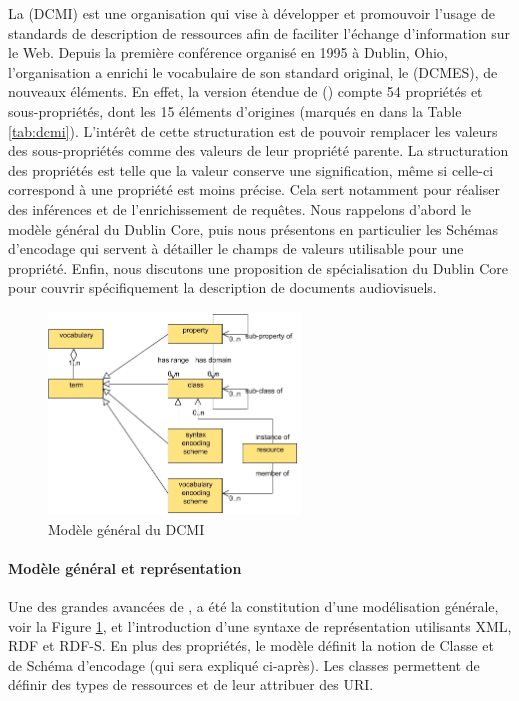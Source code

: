 La  (DCMI) est une organisation qui vise à développer et promouvoir l'usage de standards de description de ressources afin de faciliter l'échange d'information sur le Web.
Depuis la première conférence organisé en 1995 à Dublin, Ohio, l'organisation a enrichi le vocabulaire de son standard original, le  (DCMES), de nouveaux éléments. 
En effet, la version étendue de  (\cite{DCMIUsageBoard2010}) compte 54 propriétés et sous-propriétés, dont les 15 éléments d'origines (marqués en  dans la Table \ref{tab:dcmi}).
L'intérêt de cette structuration est de pouvoir remplacer les valeurs des sous-propriétés comme des valeurs de leur propriété parente. 
La structuration des propriétés est telle que la valeur conserve une signification, même si celle-ci correspond à une propriété est moins précise. 
Cela sert notamment pour réaliser des inférences et de l'enrichissement de requêtes.
Nous rappelons d'abord le modèle général du Dublin Core, puis nous présentons en particulier les Schémas d'encodage qui servent à détailler le champs de valeurs utilisable pour une propriété.
Enfin, nous discutons une proposition de spécialisation du Dublin Core pour couvrir spécifiquement la description de documents audiovisuels.

\begin{figure}[ht!]
\centering
\includegraphics[width=0.6\textwidth]{images/vocabulary-model.jpg}
\caption{Modèle général du DCMI}
\label{img:dcmi-voc}
\end{figure}

\paragraph{Modèle général et représentation}
Une des grandes avancées de , a été la constitution d'une modélisation générale, voir la Figure \ref{img:dcmi-voc}, et l'introduction d'une syntaxe de représentation utilisants XML, RDF et RDF-S. 
En plus des propriétés, le modèle définit la notion de Classe et de Schéma d'encodage (qui sera expliqué ci-après). 
Les classes permettent de définir des types de ressources et de leur attribuer des URI. 

